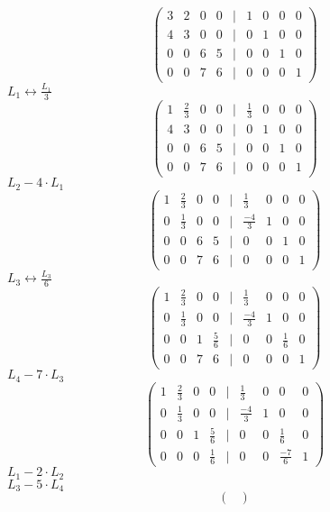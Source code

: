 \documentclass[leqno]{article}
\begin{document}
\begin{enumerate}
		\begin{sol} 
			  $$\begin{pmatrix}
			  	3 & 2 & 0 & 0 & | & 1 & 0 & 0 & 0\\
			  	4 & 3 & 0 & 0 & | & 0 & 1 & 0 & 0\\
			  	0 & 0 & 6 & 5 & | & 0 & 0 & 1 & 0\\
			  	0 & 0 & 7 & 6 & | & 0 & 0 & 0 & 1
			  \end{pmatrix}$$ 
			  $L_1 \longleftrightarrow \frac{L_1}{3}$
			  $$\begin{pmatrix}
			  	1 & \frac{2}{3} & 0 & 0 & | & \frac{1}{3} & 0 & 0 & 0\\
			  	4 & 3 & 0 & 0 & | & 0 & 1 & 0 & 0\\
			  	0 & 0 & 6 & 5 & | & 0 & 0 & 1 & 0\\
			  	0 & 0 & 7 & 6 & | & 0 & 0 & 0 & 1
			  \end{pmatrix}$$
			  $L_2 - 4 \cdot L_1$
			  $$\begin{pmatrix}
			  	1 & \frac{2}{3} & 0 & 0 & | & \frac{1}{3} & 0 & 0 & 0\\
			  	0 & \frac{1}{3} & 0 & 0 & | & \frac{-4}{3} & 1 & 0 & 0\\
			  	0 & 0 & 6 & 5 & | & 0 & 0 & 1 & 0\\
			  	0 & 0 & 7 & 6 & | & 0 & 0 & 0 & 1
			  \end{pmatrix}$$
			  $L_3 \longleftrightarrow \frac{L_3}{6}$
			  $$\begin{pmatrix}
			  	1 & \frac{2}{3} & 0 & 0 & | & \frac{1}{3} & 0 & 0 & 0\\
			  	0 & \frac{1}{3} & 0 & 0 & | & \frac{-4}{3} & 1 & 0 & 0\\
			  	0 & 0 & 1 & \frac{5}{6} & | & 0 & 0 & \frac{1}{6} & 0\\
			  	0 & 0 & 7 & 6 & | & 0 & 0 & 0 & 1
			  \end{pmatrix}$$
		  	  $L_4 - 7 \cdot L_3$
		  	  $$\begin{pmatrix}
		  		1 & \frac{2}{3} & 0 & 0 & | & \frac{1}{3} & 0 & 0 & 0\\
		  		0 & \frac{1}{3} & 0 & 0 & | & \frac{-4}{3} & 1 & 0 & 0\\
		  		0 & 0 & 1 & \frac{5}{6} & | & 0 & 0 & \frac{1}{6} & 0\\
		  		0 & 0 & 0 & \frac{1}{6} & | & 0 & 0 & \frac{-7}{6} & 1
		  	  \end{pmatrix}$$
	  	  	  $L_1 - 2 \cdot L_2$\\
	  	  	  $L_3 - 5 \cdot L_4$
	  	  	  $$\begin{pmatrix}

\end{pmatrix}$$
\end{sol}
\end{enumerate}
\end{document}
